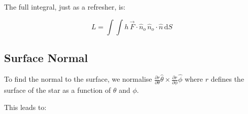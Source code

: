 \documentclass[11pt]{amsart}
\begin{document}
The full integral, just as a refresher, is:

\begin{equation}
L = \int \int h \, \vec{F} \! \cdot \! \hat{n}_{o} \, \hat{n}_{o} \! \cdot \! \hat{n} \, \text{d}S
\end{equation}


\subsection{Surface Normal} \label{Lum:Norm}

To find the normal to the surface, we normalise $\frac{\partial r}{\partial \theta} \hat{\theta} \times \frac{\partial r}{\partial \phi} \hat{\phi}$ where $r$ defines the surface of the star as a function of $\theta$ and $\phi$.

This leads to:


















\end{document}
